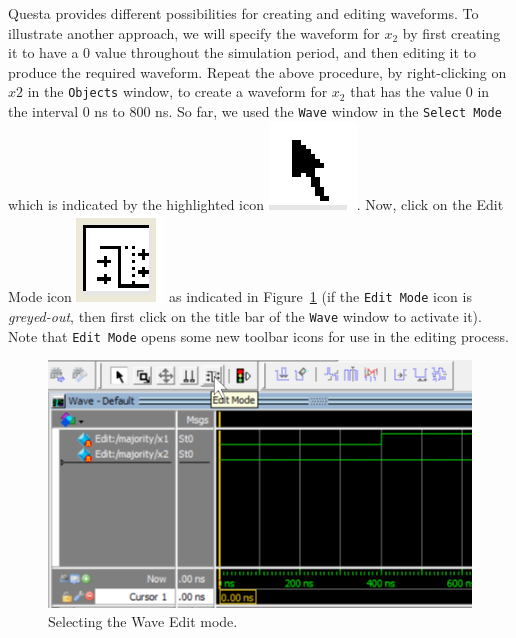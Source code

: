 \documentclass[11pt, twoside, pdftex]{article}
\begin{document}
Questa provides different possibilities for creating and editing waveforms. To illustrate another
approach, we will specify the waveform for $x_2$ by first creating it to have a 0 value
throughout the simulation period, and then editing it to produce the required waveform.
Repeat the above procedure, by right-clicking on $x2$ in the \texttt{Objects} window,
to create a waveform for $x_2$ that has the value 0 in the interval 0 ns to 800 ns. 
So far, we used the \texttt{Wave} window in the \texttt{Select Mode} which is indicated by the 
highlighted icon  \includegraphics[scale=1]{figures/icon2.png}. Now, click on the {\sf Edit Mode}
icon \includegraphics[scale=1]{figures/icon3.png} as indicated in Figure~\ref{fig:15} 
(if the \texttt{Edit Mode} icon is {\it greyed-out}, then first click on the title bar of the 
\texttt{Wave} window to activate it).  Note that \texttt{Edit Mode} opens some new toolbar 
icons for use in the editing process.

\begin{figure}[H]
   \begin{center}
      \includegraphics[scale=0.75]{figures/edit_mode.png}
   \caption{Selecting the Wave Edit mode.} 
	 \label{fig:15}
	 \end{center}
\end{figure}
\end{document}
